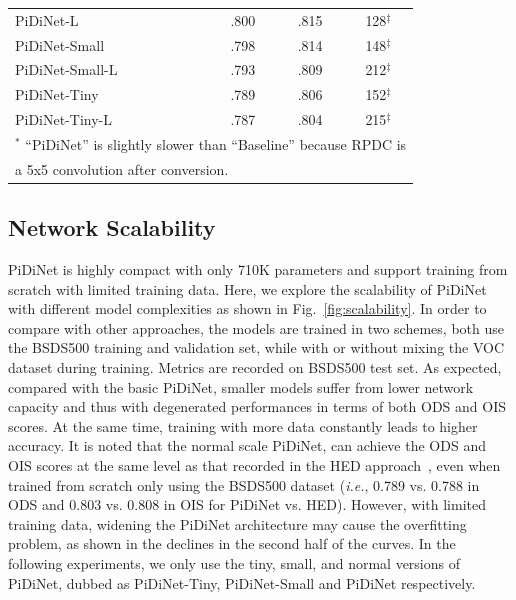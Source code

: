 \documentclass[10pt,twocolumn,letterpaper]{article}
\begin{document}
\begin{table}[t!]
\begin{center}
{\begin{tabular}{l|c|c|c}
PiDiNet-L & .800 & .815 & 128$^\ddagger$ \\
PiDiNet-Small & .798 & .814 & 148$^\ddagger$ \\
PiDiNet-Small-L & .793 & .809 & 212$^\ddagger$ \\
PiDiNet-Tiny & .789 & .806 & 152$^\ddagger$ \\
PiDiNet-Tiny-L & .787 & .804 & 215$^\ddagger$ \\
\bottomrule[1pt]
\multicolumn{4}{l}{\footnotesize{$^\ast$ ``PiDiNet'' is slightly slower than ``Baseline'' because RPDC is}}\\
\multicolumn{4}{l}{\footnotesize{a 5x5 convolution after conversion.}}
\end{tabular}
}
\end{center}
\label{table:bsds}
\vspace{-0.2in}
\end{table}


\subsection{Network Scalability}
\label{sec:scalability}
PiDiNet is highly compact with only 710K parameters and support training from scratch with limited training data. Here, we explore the scalability of PiDiNet with different model complexities as shown in Fig.~\ref{fig:scalability}. In order to compare with other approaches, the models are trained in two schemes, both use the BSDS500 training and validation set, while with or without mixing the VOC dataset during training. Metrics are recorded on BSDS500 test set. As expected, compared with the basic PiDiNet, smaller models suffer from lower network capacity and thus with degenerated performances in terms of both ODS and OIS scores. At the same time, training with more data constantly leads to higher accuracy. It is noted that the normal scale PiDiNet, can achieve the ODS and OIS scores at the same level as that recorded in the HED approach~\cite{xie2017holistically}, even when trained from scratch only using the BSDS500 dataset (\emph{i.e.}, 0.789 vs. 0.788 in ODS and 0.803 vs. 0.808 in OIS for PiDiNet vs. HED). However, with limited training data, widening the PiDiNet architecture may cause the overfitting problem, as shown in the declines in the second half of the curves. In the following experiments, we only use the tiny, small, and normal versions of PiDiNet, dubbed as PiDiNet-Tiny, PiDiNet-Small and PiDiNet respectively.
\end{document}

